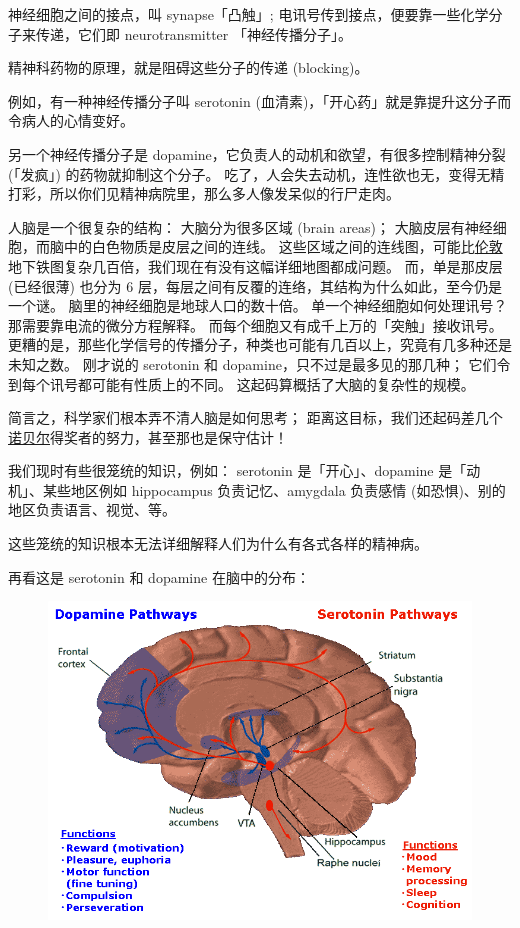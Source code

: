 \documentclass[12pt]{report}
\begin{document}
{神经细胞之间的接点，叫 synapse「凸触」; 电讯号传到接点，便要靠一些化学分子来传递，它们即 neurotransmitter 「神经传播分子」。

精神科药物的原理，就是阻碍这些分子的传递 (blocking)。

例如，有一种神经传播分子叫 serotonin (血清素)，「开心药」就是靠提升这分子而令病人的心情变好。

另一个神经传播分子是 dopamine，它负责人的动机和欲望，有很多控制精神分裂 (「发疯」) 的药物就抑制这个分子。 吃了，人会失去动机，连性欲也无，变得无精打彩，所以你们见精神病院里，那么多人像发呆似的行尸走肉。

人脑是一个很复杂的结构： 大脑分为很多区域 (brain areas)； 大脑皮层有神经细胞，而脑中的白色物质是皮层之间的连线。 这些区域之间的连线图，可能比\uline{伦敦}地下铁图复杂几百倍，我们现在有没有这幅详细地图都成问题。 而，单是那皮层 (已经很薄) 也分为 6 层，每层之间有反覆的连络，其结构为什么如此，至今仍是一个谜。 脑里的神经细胞是地球人口的数十倍。 单一个神经细胞如何处理讯号？ 那需要靠电流的微分方程解释。 而每个细胞又有成千上万的「突触」接收讯号。 更糟的是，那些化学信号的传播分子，种类也可能有几百以上，究竟有几多种还是未知之数。 刚才说的 serotonin 和 dopamine，只不过是最多见的那几种； 它们令到每个讯号都可能有性质上的不同。 这起码算概括了大脑的复杂性的规模。

简言之，科学家们根本弄不清人脑是如何思考； 距离这目标，我们还起码差几个\uline{诺贝尔}得奖者的努力，甚至那也是保守估计！

我们现时有些很笼统的知识，例如： serotonin 是「开心」、dopamine 是「动机」、某些地区例如 hippocampus 负责记忆、amygdala 负责感情 (如恐惧)、别的地区负责语言、视觉、等。

这些笼统的知识根本无法详细解释人们为什么有各式各样的精神病。

再看这是 serotonin 和 dopamine 在脑中的分布：
\begin{figure}[H]
\centering
\includegraphics[scale=0.4]{dopamine_serotonin.png}
\end{figure}

}
\end{document}
